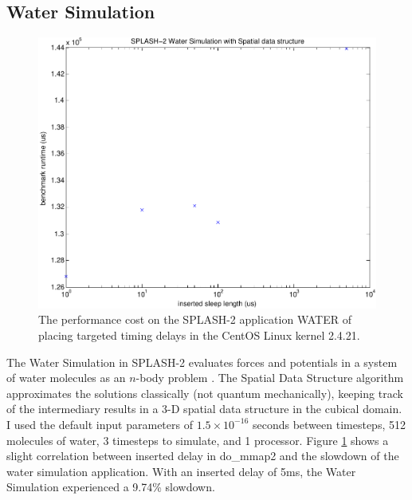 \documentclass[letterpaper,twocolumn,10pt]{article}
\begin{document}
\subsection{Water Simulation}
\begin{figure}
\centering
\includegraphics[width=\columnwidth]{water}
\caption{The performance cost on the SPLASH-2 application WATER of placing targeted timing delays in the CentOS Linux kernel 2.4.21.}
\label{fig_water}
\end{figure}
The Water Simulation in SPLASH-2 evaluates forces and potentials in a system of water molecules as an $n$-body problem \cite{Singh1992}.  The Spatial Data Structure algorithm approximates the solutions classically (not quantum mechanically), keeping track of the intermediary results in a 3-D spatial data structure in the cubical domain.  I used the default input parameters of $1.5 \times 10^{-16}$ seconds between timesteps, 512 molecules of water, 3 timesteps to simulate, and 1 processor.  Figure \ref{fig_water} shows a slight correlation between inserted delay in do\_mmap2 and the slowdown of the water simulation application.  With an inserted delay of 5ms, the Water Simulation experienced a 9.74\% slowdown.
\end{document}
